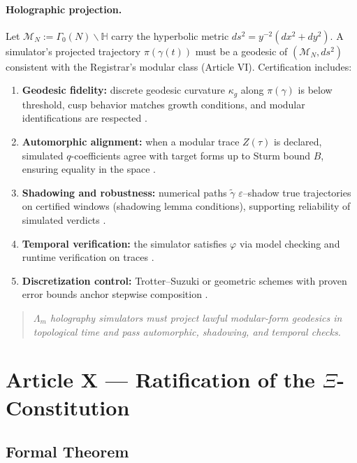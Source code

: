 \documentclass[12pt]{amsart}
\theoremstyle{plain}
\begin{document}
\paragraph{Holographic projection.}
Let $\mathcal{M}_N:=\Gamma_0(N)\backslash\mathbb{H}$ carry the hyperbolic metric $ds^2=y^{-2}(dx^2+dy^2)$. A simulator’s projected trajectory $\pi(\gamma(t))$ must be a geodesic of $(\mathcal{M}_N,ds^2)$ consistent with the Registrar’s modular class (Article VI). Certification includes:
\begin{enumerate}
  \item \textbf{Geodesic fidelity:} discrete geodesic curvature $\kappa_g$ along $\pi(\gamma)$ is below threshold, cusp behavior matches growth conditions, and modular identifications are respected \cite{iwaniec2002spectral,katok1992fuchsian}.
  \item \textbf{Automorphic alignment:} when a modular trace $Z(\tau)$ is declared, simulated $q$-coefficients agree with target forms up to Sturm bound $B$, ensuring equality in the space \cite{sturm1987congruence,diamond2005first}.
  \item \textbf{Shadowing and robustness:} numerical paths $\tilde{\gamma}$ $\varepsilon$–shadow true trajectories on certified windows (shadowing lemma conditions), supporting reliability of simulated verdicts \cite{pilyugin1999shadowing}.
  \item \textbf{Temporal verification:} the simulator satisfies $\varphi$ via model checking and runtime verification on traces \cite{baier2008model,clarke1999model}.
  \item \textbf{Discretization control:} Trotter–Suzuki or geometric schemes with proven error bounds anchor stepwise composition \cite{trotter1959product,suzuki1976generalized,hairer2006geometric}.
\end{enumerate}

\begin{quote}
\textit{$\Lambda_m$ holography simulators must project lawful modular-form geodesics in topological time and pass automorphic, shadowing, and temporal checks.}
\end{quote}


\section{Article X — Ratification of the $\Xi$-Constitution}

\subsection{Formal Theorem}
\end{document}
